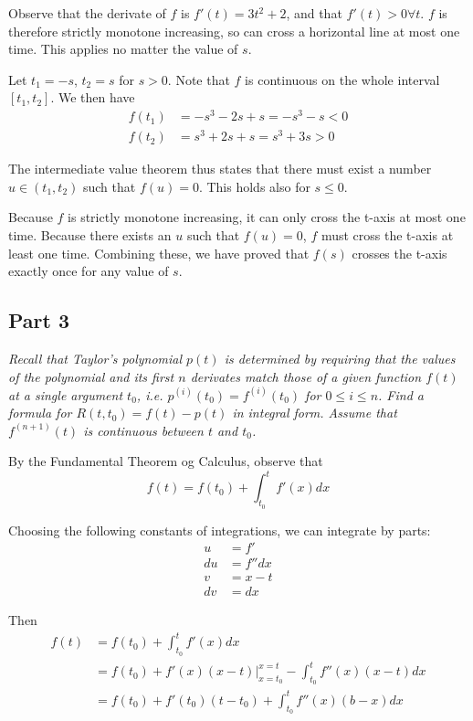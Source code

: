 Observe that the derivate of $f$ is $f'(t) = 3t^2 + 2$, and that $f'(t) > 0 \forall t$. $f$ is therefore strictly monotone increasing, so can cross a horizontal line at most one time. This applies no matter the value of $s$.

Let $t_1 = -s$, $t_2 = s$ for $s > 0$. Note that $f$ is continuous on the whole interval $[t_1, t_2]$. We then have
\begin{align*}
    f(t_1) &= -s^3 - 2s + s = -s^3 - s < 0 \\
    f(t_2) &= s^3 + 2s + s = s^3 + 3s > 0
\end{align*}

The intermediate value theorem thus states that there must exist a number $u \in (t_1, t_2)$ such that $f(u) = 0$. This holds also for $s \le 0$.

Because $f$ is strictly monotone increasing, it can only cross the t-axis at most one time. Because there exists an $u$ such that $f(u) = 0$, $f$ must cross the t-axis at least one time. Combining these, we have proved that $f(s)$ crosses the t-axis exactly once for any value of $s$.



\subsection{Part 3}
\textit{Recall that Taylor's polynomial $p(t)$ is determined by requiring that the values of the polynomial and its first $n$ derivates match those of a given function $f(t)$ at a single argument $t_0$, i.e. $p^{(i)}(t_0) = f^{(i)}(t_0)$ for $0 \le i \le n$. Find a formula for $R(t, t_0) = f(t) - p(t)$ in integral form. Assume that $f^{(n+1)}(t)$ is continuous between $t$ and $t_0$.}

By the Fundamental Theorem og Calculus, observe that
\begin{equation*}
    f(t) = f(t_0) + \int_{t_0}^t f'(x) dx
\end{equation*}

Choosing the following constants of integrations, we can integrate by parts:
\begin{align*}
    u &= f' \\
    du &= f'' dx \\
    v &= x - t \\
    dv &= dx 
\end{align*}

Then
\begin{align*}
    f(t) &= f(t_0) + \int_{t_0}^t f'(x) dx \\
        &= f(t_0) + f'(x)(x - t) |_{x=t_0}^{x=t} - \int_{t_0}^t f''(x)(x - t) dx \\
        &= f(t_0) + f'(t_0)(t - t_0) + \int_{t_0}^t f''(x)(b - x) dx
\end{align*}

